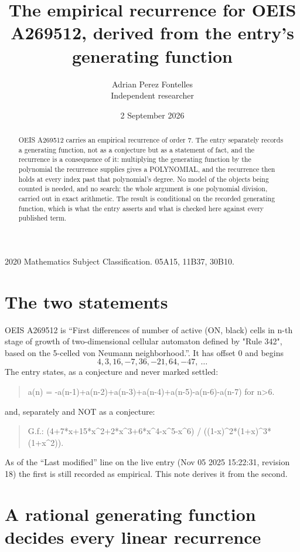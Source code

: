 \documentclass[11pt,a4paper]{article}
\title{The empirical recurrence for OEIS A269512, derived from the entry's generating function}
\author{Adrian Perez Fontelles\\ \small Independent researcher}
\date{2 September 2026}
\theoremstyle{plain}
\theoremstyle{definition}
\begin{document}
\maketitle

\begin{abstract}
OEIS A269512 carries an empirical recurrence of order $7$. The entry separately records a
generating function, not as a conjecture but as a statement of fact, and the recurrence is a
consequence of it: multiplying the generating function by the polynomial the recurrence
supplies gives a POLYNOMIAL, and the recurrence then holds at every index past that
polynomial's degree. No model of the objects being counted is needed, and no search: the
whole argument is one polynomial division, carried out in exact arithmetic. The result is
conditional on the recorded generating function, which is what the entry asserts and what is
checked here against every published term.
\end{abstract}

\noindent\small 2020 Mathematics Subject Classification. 05A15, 11B37, 30B10.\normalsize

\section{The two statements}

OEIS A269512 is ``First differences of number of active (ON, black) cells in n-th stage of growth of two-dimensional cellular automaton defined by "Rule 342", based on the 5-celled von Neumann neighborhood.''. It has offset $0$ and begins
\[
4, 3, 16, -7, 36, -21, 64, -47,\ \dots
\]
The entry states, as a conjecture and never marked settled:
\begin{quote}
a(n) = -a(n-1)+a(n-2)+a(n-3)+a(n-4)+a(n-5)-a(n-6)-a(n-7) for n>6.
\end{quote}
and, separately and NOT as a conjecture:
\begin{quote}
G.f.: (4+7*x+15*x\^{}2+2*x\^{}3+6*x\^{}4-x\^{}5-x\^{}6) / ((1-x)\^{}2*(1+x)\^{}3*(1+x\^{}2)).
\end{quote}
As of the ``Last modified'' line on the live entry (Nov 05 2025 15:22:31, revision 18) the first is still
recorded as empirical. This note derives it from the second.

\section{A rational generating function decides every linear recurrence}
\end{document}
